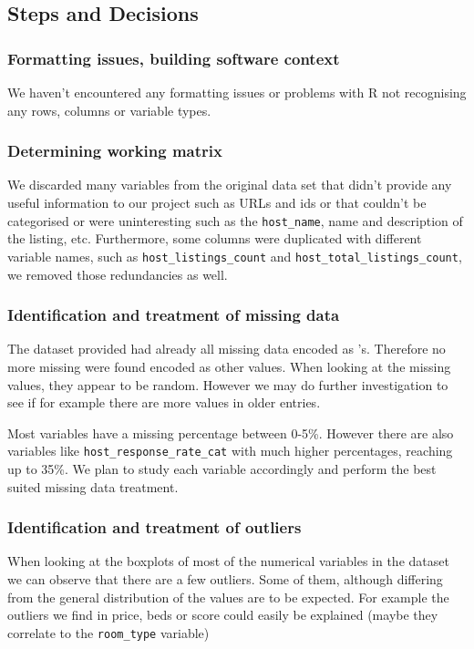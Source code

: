 
\subsection{Steps and Decisions}%
\label{sub:steps-decisions}

\subsubsection{Formatting issues, building software context}
We haven't encountered any formatting issues or problems with R
not recognising any rows, columns or variable types.

\subsubsection{Determining working matrix}\label{ssub:work_matrix}
We discarded many variables from the original data set that didn't 
provide any useful information to our project such as URLs and ids or that couldn't be 
categorised or were uninteresting such as the \texttt{host\_name}, name 
and description of the listing, etc. Furthermore, some columns were duplicated with
different variable names, such as \texttt{host\_listings\_count} and 
\texttt{host\_total\_listings\_count}, we removed those redundancies as well.

\subsubsection{Identification and treatment of missing data}
The dataset provided had already all missing data encoded as \NA's. Therefore no more
missing were found encoded as other values. When looking at the missing values, they
appear to be random. However we may do further investigation to see if for example
there are more values in older entries.

Most variables have a missing percentage between 0-5\%. However there are also variables
like \texttt{host\_response\_rate\_cat} with much higher percentages, reaching up to 35\%.
We plan to study each variable accordingly and perform the best suited missing data
treatment. 

\subsubsection{Identification and treatment of outliers}
When looking at the boxplots of most of the numerical variables in the dataset we can observe
that there are a few outliers. Some of them, although differing from the general 
distribution of the values are to be expected. For example the outliers we find in price,
beds or score could easily be explained (maybe they correlate to the \texttt{room\_type} variable)

